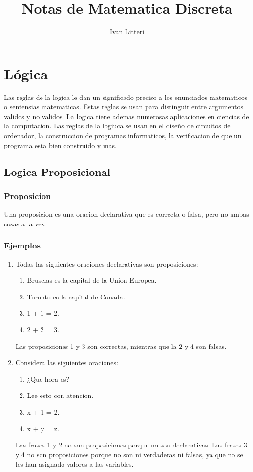 \documentclass[]{article}
\title{Notas de Matematica Discreta}
\author{Ivan Litteri}
\date{}
\begin{document}
\maketitle

\section{Lógica}\label{sec:logica}

Las reglas de la logica le dan un significado preciso a los enunciados matematicos o sentensias matematicas. Estas reglas se usan para distinguir entre argumentos validos y no validos. La logica tiene ademas numerosas aplicaciones en ciencias de la computacion. Las reglas de la logiuca se usan en el diseño de circuitos de ordenador, la construccion de programas informaticos, la verificacion de que un programa esta bien construido y mas.

\subsection{Logica Proposicional}

\subsubsection*{Proposicion}
Una proposicion es una oracion declarativa que es correcta o falsa, pero no ambas cosas a la vez.

\subsubsection*{Ejemplos}

\begin{enumerate}
	\item Todas las siguientes oraciones declarativas son proposiciones:
		\begin{enumerate}
			\item Bruselas es la capital de la Union Europea.
			\item Toronto es la capital de Canada.
			\item 1 + 1 = 2.
			\item 2 + 2 = 3.
		\end{enumerate}
	Las proposiciones 1 y 3 son correctas, mientras que la 2 y 4 son falsas.
	
	\item Considera las siguientes oraciones:
		\begin{enumerate}
			\item ¿Que hora es?
			\item Lee esto con atencion.
			\item x + 1 = 2.
			\item x + y = z.
		\end{enumerate}
	Las frases 1 y 2 no son proposiciones porque no son declarativas. Las frases 3 y 4 no son proposiciones porque no son ni verdaderas ni falsas, ya que no se les han asignado valores a las variables. 
\end{enumerate}
\end{document}
